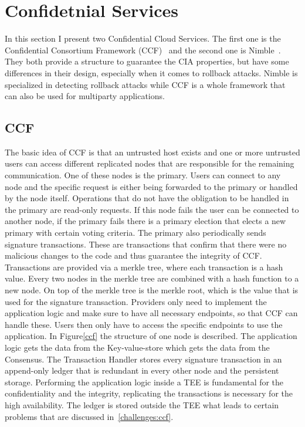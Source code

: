 \section{Confidetnial Services}
In this section I present two Confidential Cloud Services. The first one is the Confidential Consortium Framework (CCF)~\cite{Howard} and the second one is Nimble~\cite{Nimble}. They both provide a structure to guarantee the CIA properties, but have some differences in their design, especially when it comes to rollback attacks. Nimble is specialized in detecting rollback attacks while CCF is a whole framework that can also be used for multiparty applications.
\subsection{CCF}
The basic idea of CCF is that an untrusted host exists and one or more untrusted users can access different replicated nodes that are responsible for the remaining communication. One of these nodes is the primary. Users can connect to any node and the specific request is either being forwarded to the primary or handled by the node itself. Operations that do not have the obligation to be handled in the primary are read-only requests. If this node fails the user can be connected to another node, if the primary fails there is a primary election that elects a new primary with certain voting criteria. The primary also periodically sends signature transactions. These are transactions that confirm that there were no malicious changes to the code and thus guarantee the integrity of CCF. Transactions are provided via a merkle tree, where each transaction is a hash value. Every two nodes in the merkle tree are combined with a hash function to a new node. On top of the merkle tree is the merkle root, which is the value that is used for the signature transaction.%
 Providers only need to implement the application logic and make sure to have all necessary endpoints, so that CCF can handle these. Users then only have to access the specific endpoints to use the application.  In Figure\ref{ccf} the structure of one node is described. The application logic gets the data from the Key-value-store which gets the data from the Consensus.  The Transaction Handler stores every signature transaction in an append-only ledger that is redundant in every other node and the persistent storage. Performing the application logic inside a TEE is fundamental for the confidentiality and the integrity, replicating the transactions is necessary for the high availability. The ledger is stored outside the TEE what leads to certain problems that are discussed in~\ref{challenges:ccf}.
